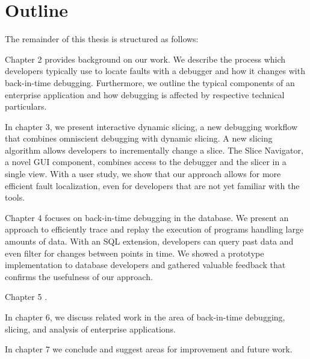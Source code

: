 \section{Outline}

The remainder of this thesis is structured as follows:

Chapter 2 provides background on our work.
We describe the process which developers typically use to locate faults with a debugger and how it changes with back-in-time debugging.
Furthermore, we outline the typical components of an enterprise application and how debugging is affected by respective technical particulars.

In chapter 3, we present interactive dynamic slicing, a new debugging workflow that combines omniscient debugging with dynamic slicing.
A new slicing algorithm allows developers to incrementally change a slice. 
The Slice Navigator, a novel GUI component, combines access to the debugger and the slicer in a single view.
With a user study, we show that our approach allows for more efficient fault localization, even for developers that are not yet familiar with the tools.

Chapter 4 focuses on back-in-time debugging in the database.
We present an approach to efficiently trace and replay the execution of programs handling large amounts of data.
With an SQL extension, developers can query past data and even filter for changes between points in time.
We showed a prototype implementation to database developers and gathered valuable feedback that confirms the usefulness of our approach.

Chapter 5 .

In chapter 6, we discuss related work in the area of back-in-time debugging, slicing, and analysis of enterprise applications.

In chapter 7 we conclude and suggest areas for improvement and future work.


%
%



